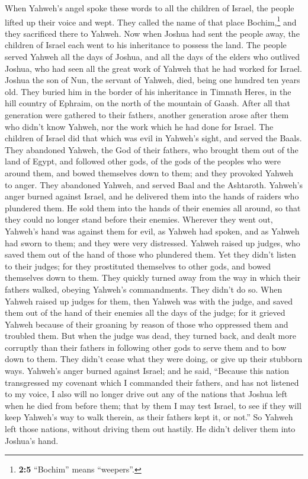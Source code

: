  When Yahweh's angel spoke these words to all the children
of Israel, the people lifted up their voice and wept. 
They called the name of that place Bochim,\footnote{\textbf{2:5}
  ``Bochim'' means ``weepers''.} and they sacrificed there to Yahweh.
 Now when Joshua had sent the people away, the children of
Israel each went to his inheritance to possess the land. 
The people served Yahweh all the days of Joshua, and all the days of the
elders who outlived Joshua, who had seen all the great work of Yahweh
that he had worked for Israel.  Joshua the son of Nun, the
servant of Yahweh, died, being one hundred ten years old. 
They buried him in the border of his inheritance in Timnath Heres, in
the hill country of Ephraim, on the north of the mountain of Gaash.
 After all that generation were gathered to their
fathers, another generation arose after them who didn't know Yahweh, nor
the work which he had done for Israel.  The children of
Israel did that which was evil in Yahweh's sight, and served the Baals.
 They abandoned Yahweh, the God of their fathers, who
brought them out of the land of Egypt, and followed other gods, of the
gods of the peoples who were around them, and bowed themselves down to
them; and they provoked Yahweh to anger.  They abandoned
Yahweh, and served Baal and the Ashtaroth.  Yahweh's
anger burned against Israel, and he delivered them into the hands of
raiders who plundered them. He sold them into the hands of their enemies
all around, so that they could no longer stand before their enemies.
 Wherever they went out, Yahweh's hand was against them
for evil, as Yahweh had spoken, and as Yahweh had sworn to them; and
they were very distressed.  Yahweh raised up judges, who
saved them out of the hand of those who plundered them. 
Yet they didn't listen to their judges; for they prostituted themselves
to other gods, and bowed themselves down to them. They quickly turned
away from the way in which their fathers walked, obeying Yahweh's
commandments. They didn't do so.  When Yahweh raised up
judges for them, then Yahweh was with the judge, and saved them out of
the hand of their enemies all the days of the judge; for it grieved
Yahweh because of their groaning by reason of those who oppressed them
and troubled them.  But when the judge was dead, they
turned back, and dealt more corruptly than their fathers in following
other gods to serve them and to bow down to them. They didn't cease what
they were doing, or give up their stubborn ways. 
Yahweh's anger burned against Israel; and he said, ``Because this nation
transgressed my covenant which I commanded their fathers, and has not
listened to my voice,  I also will no longer drive out
any of the nations that Joshua left when he died from before them;
 that by them I may test Israel, to see if they will keep
Yahweh's way to walk therein, as their fathers kept it, or not.''
 So Yahweh left those nations, without driving them out
hastily. He didn't deliver them into Joshua's hand.

